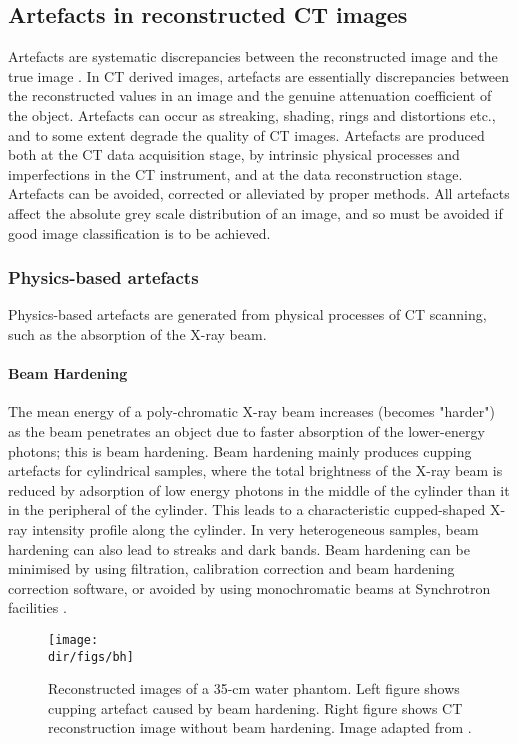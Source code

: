 \subsection{Artefacts in reconstructed CT images}
Artefacts are systematic discrepancies between the reconstructed image and the true image \citep{barrett2004artifacts}. In CT derived images, artefacts are essentially discrepancies between the reconstructed values in an image and the genuine attenuation coefficient of the object. Artefacts can occur as streaking, shading, rings and distortions etc., and to some extent degrade the quality of CT images. Artefacts are produced both at the CT data acquisition stage, by intrinsic physical processes and imperfections in the CT instrument, and at the data reconstruction stage. Artefacts can be avoided, corrected or alleviated by proper methods. All artefacts affect the absolute grey scale distribution of an image, and so must be avoided if good image classification is to be achieved.

\subsubsection{Physics-based artefacts}
Physics-based artefacts are generated from physical processes of CT scanning, such as the absorption of the X-ray beam. 

\paragraph{Beam Hardening}
The mean energy of a poly-chromatic X-ray beam increases (becomes "harder") as the beam penetrates an object due to faster absorption of the lower-energy photons; this is beam hardening. Beam hardening mainly produces cupping artefacts for cylindrical samples, where the  total brightness of the X-ray beam is reduced by adsorption of low energy photons in the middle of the cylinder than it in the peripheral of the cylinder. This leads to a characteristic cupped-shaped X-ray intensity profile along the cylinder. In very heterogeneous samples, beam hardening can also lead to streaks and dark bands. Beam hardening can be minimised by using filtration, calibration correction and beam hardening correction software, or avoided by using monochromatic beams at Synchrotron facilities \citep{barrett2004artifacts}.

\begin{figure}[htbp]
  \centering
  \texttt{[image: \\dir/figs/bh]}
  \caption{ Reconstructed images of a 35-cm water phantom. Left figure shows cupping artefact caused by beam hardening. Right figure shows CT reconstruction image without beam hardening. Image adapted from \citep{hsieh2003computed}.}
  \label{bh}
\end{figure}

